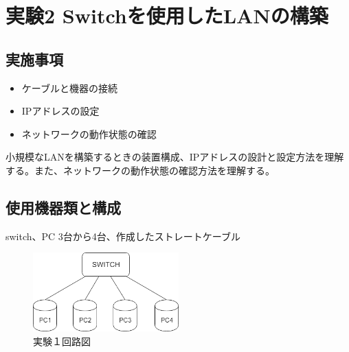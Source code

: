 \documentclass[10pt]{article}
\begin{document}
\section{実験2 Switchを使用したLANの構築}

\subsection{実施事項}
\begin{itemize}
    \item ケーブルと機器の接続 
    \item IPアドレスの設定
    \item ネットワークの動作状態の確認
\end{itemize}

小規模なLANを構築するときの装置構成、IPアドレスの設計と設定方法を理解する。また、ネットワークの動作状態の確認方法を理解する。

\subsection{使用機器類と構成}
switch、PC 3台から4台、作成したストレートケーブル 
\begin{figure}[H]
		\centering
		\includegraphics[width=0.5\textwidth]{networkExpreriment.png}
		\caption{実験１回路図}
	\end{figure}
\end{document}
